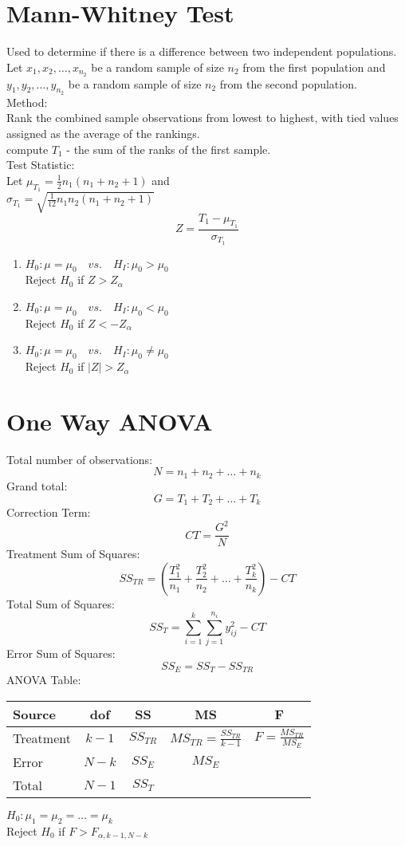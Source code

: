 \documentclass[10pt]{article}
\newcommand{\iSum}[2]{\sum_{i= #1}^{#2}}
\newcommand{\jSum}[2]{\sum_{j= #1}^{#2}}
\newcommand{\abs}[1]{\lvert#1\rvert}
\begin{document}
\begin{multicols}{2}
\section*{Mann-Whitney Test}
Used to determine if there is a difference between two independent populations.  Let $x_{1}, x_{2}, \ldots, x_{n_{2}}$ be a random sample of size $n_{2}$ from the first population and $y_{1}, y_{2}, \ldots, y_{n_{2}}$ be a random sample of size $n_{2}$ from the second population.\\
Method:\\
Rank the combined sample observations from lowest to highest, with tied values assigned as the average of the rankings.\\
compute $T_{1}$ - the sum of the ranks of the first sample.\\
Test Statistic:\\
Let $\mu_{T_{1}} = \frac{1}{2}n_{1}(n_{1}+n_{2}+1)$ and\\
$\sigma_{T_{1}} = \sqrt{\frac{1}{12}n_{1}n_{2}(n_{1}+n_{2}+1)}$\\
$$Z = \frac{T_{1}-\mu_{T_{1}}}{\sigma_{T_{1}}}$$
\begin{enumerate}
	\item $H_{0}:\mu=\mu_{0}\quad vs. \quad H_{I}:\mu_{0}>\mu_{0}$
	\\Reject $H_{0}$ if $Z > Z_{\alpha}$
	\item $H_{0}:\mu=\mu_{0}\quad vs. \quad H_{I}:\mu_{0}<\mu_{0}$
	\\Reject $H_{0}$ if $Z < -Z_{\alpha}$
	\item $H_{0}:\mu=\mu_{0}\quad vs. \quad H_{I}:\mu_{0}\neq\mu_{0}$
	\\Reject $H_{0}$ if $\abs{Z} > Z_{\alpha}$
\end{enumerate}

\section*{One Way ANOVA}
Total number of observations: $$N = n_{1} + n_{2} + \ldots + n_{k}$$
Grand total: $$G = T_{1} + T_{2} + \ldots + T_{k}$$
Correction Term: $$CT = \frac{G^{2}}{N}$$
Treatment Sum of Squares: $$SS_{TR} = \left( \frac{T_{1}^{2}}{n_{1}} + \frac{T_{2}^{2}}{n_{2}} + \ldots + \frac{T_{k}^{2}}{n_{k}} \right) -CT$$
Total Sum of Squares: $$SS_{T} = \iSum{1}{k}\jSum{1}{n_{i}}y^{2}_{ij}-CT$$
Error Sum of Squares: $$SS_{E} = SS_{T} - SS_{TR}$$
ANOVA Table:
\begin{center}
\begin{tabular}{|l|c|c|c|c|}
	\hline
	Source & dof & SS & MS & F \\
	\hline
	\hline
	Treatment & $k-1$ & $SS_{TR}$ & $MS_{TR} = \frac{SS_{TR}}{k-1}$ & $F = \frac{MS_{TR}}{MS_{E}}$\\
	\hline
	Error & $N - k$ & $SS_{E}$ & $MS_{E}$ & \\
	\hline
	\hline
	Total & $N - 1$ & $SS_{T}$ & & \\
	\hline
\end{tabular}
\end{center}
$H_{0}: \mu_{1}=\mu_{2}=\ldots=\mu_{k}$\\
Reject $H_{0}$ if $F > F_{\alpha, k-1, N-k}$


\end{multicols}
\end{document}
